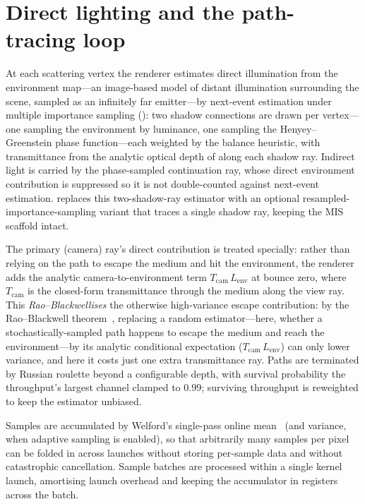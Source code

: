 \section{Direct lighting and the path-tracing loop}
\label{sec:direct-lighting}

At each scattering vertex the renderer estimates direct illumination from the environment map---an
image-based model of distant illumination surrounding the scene, sampled as an infinitely far
emitter---by next-event estimation under multiple importance sampling
(): two shadow connections are drawn per vertex---one sampling the
environment by luminance, one sampling the Henyey--Greenstein phase function---each weighted by the
balance heuristic, with transmittance from the analytic optical depth of  along
each shadow ray. Indirect light is carried by the phase-sampled continuation ray, whose direct
environment contribution is suppressed so it is not double-counted against next-event estimation.
 replaces this two-shadow-ray estimator with an optional
resampled-importance-sampling variant that traces a single shadow ray, keeping the MIS scaffold intact.

The primary (camera) ray's direct contribution is treated specially: rather than relying on the path to
escape the medium and hit the environment, the renderer adds the analytic camera-to-environment term
$T_{\text{cam}}\,L_{\text{env}}$ at bounce zero, where $T_{\text{cam}}$ is the closed-form transmittance
through the medium along the view ray. This \emph{Rao--Blackwellises} the otherwise high-variance escape contribution: by the Rao--Blackwell
theorem~\cite{Rao1945,Blackwell1947}, replacing a random estimator---here, whether a
stochastically-sampled path happens to escape the medium and reach the environment---by its analytic
conditional expectation ($T_{\text{cam}}\,L_{\text{env}}$) can only lower variance, and here it costs
just one extra transmittance ray. Paths are terminated by Russian roulette beyond a configurable depth,
with survival probability the throughput's largest channel clamped to \num{0.99}; surviving throughput
is reweighted to keep the estimator unbiased.

Samples are accumulated by Welford's single-pass online mean~\cite{Welford1962} (and variance, when adaptive sampling is
enabled), so that arbitrarily many samples per pixel can be folded in across launches without storing
per-sample data and without catastrophic cancellation. Sample batches are processed within a single
kernel launch, amortising launch overhead and keeping the accumulator in registers across the batch.

